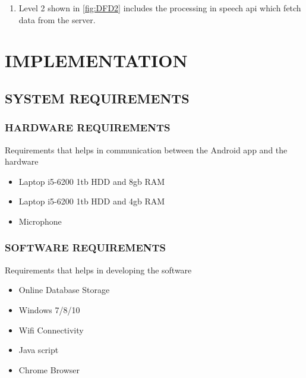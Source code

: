 \documentclass[11pt]{report} %
\begin{document}
\begin{enumerate}
	\item Level 2 shown in \autoref{fig:DFD2} includes the processing in speech api which fetch data from the server.
\end{enumerate}

%


\chapter{IMPLEMENTATION}

\section{SYSTEM REQUIREMENTS}
\label{sec:SYSTEM REQUIREMENTS}


\subsection{HARDWARE REQUIREMENTS}
\label{subsec:HARDWARE REQUIREMENTS}
Requirements that helps in communication between the Android app and the hardware
\begin{itemize}
	\item Laptop i5-6200 1tb HDD and 8gb RAM
	\item Laptop i5-6200 1tb HDD and 4gb RAM
	\item Microphone
\end{itemize}

\subsection{SOFTWARE REQUIREMENTS}
\label{subsec:SOFTWARE REQUIREMENTS}
Requirements that helps in developing the software
\begin{itemize}
	\item Online Database Storage
	\item Windows 7/8/10
	\item Wifi Connectivity
	\item Java script
	\item Chrome Browser
\end{itemize}
\end{document}

